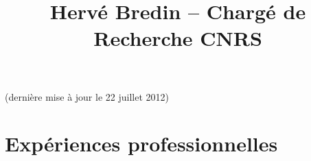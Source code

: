 \documentclass{simplecv}
\begin{document}
\pagestyle{empty} 



\title{Herv\'{e} Bredin -- Charg\'{e} de Recherche CNRS}

\maketitle

\vspace{-.5cm}
\begin{center}
(derni\`{e}re mise \`{a} jour le 22 juillet 2012)
\end{center}

\section{Exp\'{e}riences professionnelles}
\end{document}
